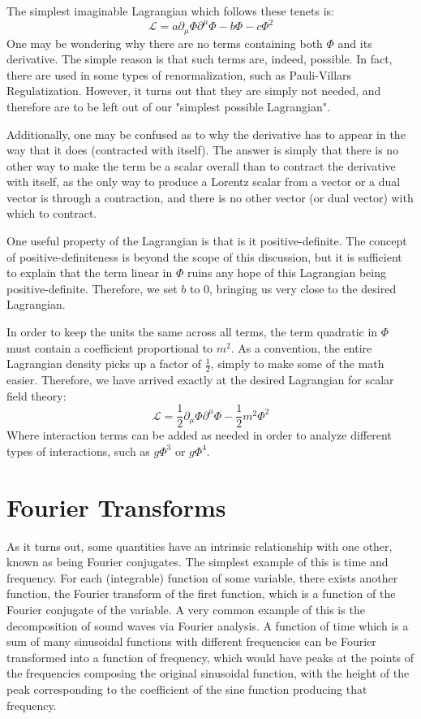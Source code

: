 \documentclass{report}
\begin{document}
\begin{appendices}
The simplest imaginable Lagrangian which follows these tenets is:
\[
\mathcal{L} = a \partial_\mu\Phi\partial^\mu\Phi - b \Phi - c \Phi^2
\]
One may be wondering why there are no terms containing both $\Phi$ and its derivative. The simple reason is that such terms are, indeed, possible. In fact, there are used in some types of renormalization, such as Pauli-Villars Regulatization. However, it turns out that they are simply not needed, and therefore are to be left out of our "simplest possible Lagrangian".

Additionally, one may be confused as to why the derivative has to appear in the way that it does (contracted with itself). The answer is simply that there is no other way to make the term be a scalar overall than to contract the derivative with itself, as the only way to produce a Lorentz scalar from a vector or a dual vector is through a contraction, and there is no other vector (or dual vector) with which to contract.

One useful property of the Lagrangian is that is it positive-definite. The concept of positive-definiteness is beyond the scope of this discussion, but it is sufficient to explain that the term linear in $\Phi$ ruins any hope of this Lagrangian being positive-definite. Therefore, we set $b$ to 0, bringing us very close to the desired Lagrangian.

In order to keep the units the same across all terms, the term quadratic in $\Phi$ must contain a coefficient proportional to $m^2$. As a convention, the entire Lagrangian density picks up a factor of $\frac{1}{2}$, simply to make some of the math easier. Therefore, we have arrived exactly at the desired Lagrangian for scalar field theory:
\[
\mathcal{L} = \frac{1}{2}\partial_\mu\Phi\partial^\mu\Phi - \frac{1}{2}m^2\Phi^2
\]
Where interaction terms can be added as needed in order to analyze different types of interactions, such as $g \Phi^3$ or $g \Phi^4$.

\chapter{Fourier Transforms}
As it turns out, some quantities have an intrinsic relationship with one other, known as being Fourier conjugates. The simplest example of this is time and frequency. For each (integrable) function of some variable, there exists another function, the Fourier transform of the first function, which is a function of the Fourier conjugate of the variable. A very common example of this is the decomposition of sound waves via Fourier analysis. A function of time which is a sum of many sinusoidal functions with different frequencies can be Fourier transformed into a function of frequency, which would have peaks at the points of the frequencies composing the original sinusoidal function, with the height of the peak corresponding to the coefficient of the sine function producing that frequency.


\end{appendices}
\end{document}
